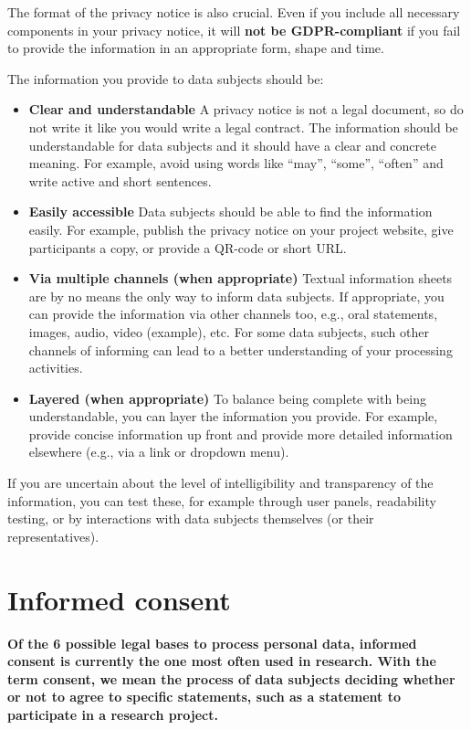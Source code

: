 \documentclass[
]{book}
\begin{document}
The format of the privacy notice is also crucial. Even if you include all
necessary components in your privacy notice, it will \textbf{not be GDPR-compliant}
if you fail to provide the information in an appropriate form, shape and time.

The information you provide to data subjects should be:

\begin{itemize}
\item
  \textbf{Clear and understandable}
  A privacy notice is not a legal document, so do not write it like you would
  write a legal contract. The information should be understandable for data
  subjects and it should have a clear and concrete meaning. For example, avoid
  using words like ``may'', ``some'', ``often'' and write active and short sentences.
\item
  \textbf{Easily accessible}
  Data subjects should be able to find the information easily. For example, publish
  the privacy notice on your project website, give participants a copy, or provide
  a QR-code or short URL.
\item
  \textbf{Via multiple channels (when appropriate)}
  Textual information sheets are by no means the only way to inform data subjects.
  If appropriate, you can provide the information via other channels too, e.g.,
  oral statements, images, audio, video
  (example),
  etc. For some data subjects, such other channels of informing can lead to a better
  understanding of your processing activities.
\item
  \textbf{Layered (when appropriate)}
  To balance being complete with being understandable, you can layer the
  information you provide. For example, provide concise information up front and
  provide more detailed information elsewhere (e.g., via a link or dropdown menu).
\end{itemize}

If you are uncertain about the level of intelligibility and transparency of the
information, you can test these, for example through user panels, readability
testing, or by interactions with data subjects themselves (or their
representatives).

\hypertarget{informed-consent-forms}{%
\section{Informed consent}\label{informed-consent-forms}}

\textbf{Of the 6 possible legal bases to process personal data, informed consent is
currently the one most often used in research. With the term consent, we mean
the process of data subjects deciding whether or not to agree to specific
statements, such as a statement to participate in a research project.}
\end{document}
